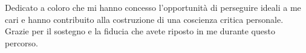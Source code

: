 \cleardoublepage
{}
\thispagestyle{empty}

\vspace*{3cm}

\begin{center}
    Dedicato a coloro che mi hanno concesso l'opportunità di perseguire ideali a me cari e hanno contribuito alla costruzione di una coscienza critica personale. 
    \newline
    Grazie per il sostegno e la fiducia che avete riposto in me durante questo percorso.
\end{center}

